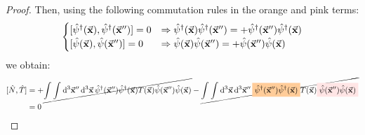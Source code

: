 \documentclass[11pt, a4paper, twoside, openright]{article}
\begin{document}
\begin{proof}
Then, using the following commutation rules in the orange and pink terms:
\begin{equation}
  \begin{cases}
   [ \hat{\psi } ^\dag (\va{x}), \hat{\psi }^\dag (\va{x}'') ]=0 & \Rightarrow  \hat{\psi } ^\dag (\va{x}) \hat{\psi }^\dag (\va{x}'') = + \hat{\psi }^\dag (\va{x}'') \hat{\psi } ^\dag (\va{x}) \\
   [ \hat{\psi }  (\va{x}), \hat{\psi }(\va{x}'') ]=0 & \Rightarrow  \hat{\psi }  (\va{x}) \hat{\psi } (\va{x}'') = + \hat{\psi } (\va{x}'') \hat{\psi } (\va{x})
  \end{cases}
  \label{eq:commutator_0}
\end{equation}
we obtain:
\begin{equation*}
\begin{split}
  [\hat{N},\hat{T}  ] &= +
    \cancel{ \int_{}^{} \int_{}^{} \dd[3]{\va{x}''} \dd[3]{\va{x}}  \hat{\psi }^\dag (\va{x}'')  \hat{\psi }^\dag (\va{x})
    T (\va{x}) \hat{\psi } (\va{x}'') \hat{\psi }(\va{x})}
    -
    \cancel{\int_{}^{} \int_{}^{} \dd[3]{\va{x}} \dd[3]{\va{x}''} \mathcolorbox{orange!40}{    \hat{\psi }^\dag (\va{x}'') \hat{\psi } ^\dag  (\va{x}) } T (\va{x})  \mathcolorbox{pink!40}{  \hat{\psi }(\va{x}'') \hat{\psi } (\va{x}) }} \\
    &= 0
\end{split}
\end{equation*}


\end{proof}
\end{document}
